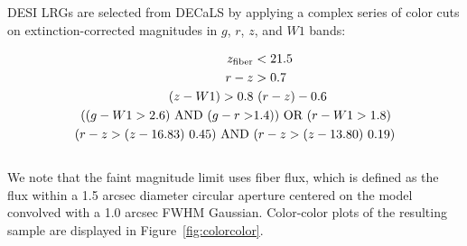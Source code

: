 DESI LRGs are selected from DECaLS by applying a complex series of color cuts on extinction-corrected magnitudes in $g$, $r$, $z$, and $W1$ bands:

\begin{equation}
\begin{split}
z_{\rm fiber} &< 21.5 \\ %
r - z &> 0.7 \\ %
(z - W1) > 0.8 &\ (r - z) - 0.6 \\ %
((g - W1 > 2.6) \text{ AND } (g - r > &1.4)) \text{ OR } (r - W1 > 1.8) \\ %
(r - z > (z - 16.83) \ 0.45) \text{ AND } &(r - z > (z - 13.80) \ 0.19) \\%
\end{split}
\end{equation} \\ 
We note that the faint magnitude limit uses fiber flux, which is defined as the flux within a 1.5 arcsec diameter circular aperture centered on the model convolved with a 1.0 arcsec FWHM Gaussian. Color-color plots of the resulting sample are displayed in Figure~\ref{fig:colorcolor}.
%

